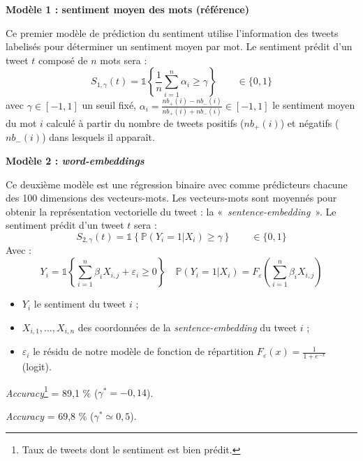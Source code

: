 \documentclass[10pt,french,french]{article}
\let\rmarkdownfootnote\footnote%
\def\footnote{\protect\rmarkdownfootnote}
\begin{document}
\begin{multicols}{2}

\textbf{Modèle 1 : sentiment moyen des mots (référence)}

Ce premier modèle de prédiction du sentiment utilise l'information des tweets labelisés pour déterminer un sentiment moyen par mot.
Le sentiment prédit d'un tweet $t$ composé de $n$ mots sera :
$$S_{1,\gamma}(t) = \mathds{1}\left\{ \frac{1}{n} \sum \limits_{i=1}^n \alpha_i \geq \gamma\right\} \qquad \in \{ 0,1\}$$
  avec $\gamma \in [-1,1]$ un seuil fixé, $\alpha_i = \frac{nb_+(i) - nb_-(i)}{nb_+(i) + nb_-(i)} \in [-1,1]$  le sentiment moyen du mot $i$ calculé à partir du nombre de tweets positifs ($nb_+(i)$) et négatifs ($nb_-(i)$) dans lesquels il apparaît.

\vspace{2.5cm}

\textbf{Modèle 2 : \emph{word-embeddings}}

Ce deuxième modèle est une régression binaire avec comme prédicteurs chacune des 100 dimensions des vecteurs-mots. Les vecteurs-mots sont moyennés pour obtenir la représentation vectorielle du tweet : la  « \emph{sentence-embedding} ».
Le sentiment prédit d'un tweet $t$ sera :
 $$S_{2,\gamma}(t) =\mathds{1}\left\{   \mathbb{P}(Y_i = 1 | X_{i}) \ge \gamma\right\} \qquad \in \{ 0,1 \}$$
Avec : 
$$Y_i = \mathds{1}\left\{ \sum_{i = 1}^n \beta_i X_{i,j} + \varepsilon_i \geq 0 \right\} 
\quad  \mathbb{P}(Y_i = 1 | X_{i}) = F_{\varepsilon}\left(\sum_{i = 1}^n \beta_i X_{i,j}\right)$$
\begin{itemize}
\item $Y_i$ le sentiment du tweet $i$ ;
\item $X_{i,1}, \dots, X_{i,n}$ des coordonnées de la \emph{sentence-embedding} du tweet $i$ ;
\item $\varepsilon_i$ le résidu de notre modèle de fonction de répartition $F_{\varepsilon}(x) = \frac{1}{1 + e^{-x}}$ (logit).
\end{itemize}

 \end{multicols}

\begin{multicols}{2}
\faArrowCircleRight{} \emph{Accuracy}\footnote{Taux de tweets dont le sentiment est bien prédit.} =  89,1 \% ($\gamma^* = -0,14$).

\faArrowCircleRight{} \emph{Accuracy} =  69,8 \% ($\gamma^* \simeq 0,5$).

 \end{multicols}
\end{document}
